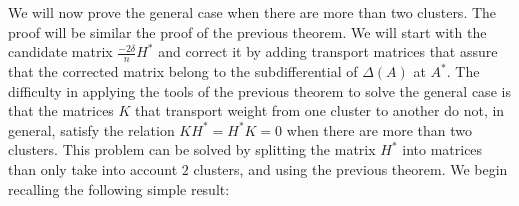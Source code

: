 \documentclass[12pt]{amsart}
\theoremstyle{remark}
\newcommand{\mv}[1]{{\color{red} \sf $\clubsuit\clubsuit\clubsuit$ Mauricio: [#1]}}
\begin{document}


We will now prove the general case when there are more than two clusters. The proof will be similar the proof of the previous theorem. We will start with the candidate matrix $\frac{-2\delta}{n}H^*$ and correct it by adding transport matrices that assure that the corrected matrix belong to the subdifferential of $\Delta(A)$ at $A^*$.
The difficulty in applying the tools of the previous theorem to solve the general case is that the matrices $K$ that transport weight from one cluster to another do not, in general, satisfy the relation $KH^* = H^*K = 0$ when there are more than two clusters. This problem can be solved by splitting the matrix $H^*$ into matrices than only take into account $2$ clusters, and using the previous theorem.
We begin recalling the following simple result:
\end{document}
